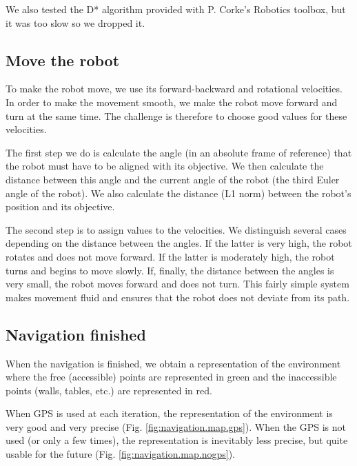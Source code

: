 \documentclass[a4paper, 10pt, conference]{ieeeconf}
\begin{document}
    We also tested the D* algorithm provided with P. Corke's Robotics toolbox, but it was too slow so we dropped it.
    
    \subsection{Move the robot}
    
    To make the robot move, we use its forward-backward and rotational velocities. In order to make the movement smooth, we make the robot move forward and turn at the same time. The challenge is therefore to choose good values for these velocities.
    
    The first step we do is calculate the angle (in an absolute frame of reference) that the robot must have to be aligned with its objective. We then calculate the distance between this angle and the current angle of the robot (the third Euler angle of the robot). We also calculate the distance (L1 norm) between the robot's position and its objective.
    
    The second step is to assign values to the velocities. We distinguish several cases depending on the distance between the angles. If the latter is very high, the robot rotates and does not move forward. If the latter is moderately high, the robot turns and begins to move slowly. If, finally, the distance between the angles is very small, the robot moves forward and does not turn. This fairly simple system makes movement fluid and ensures that the robot does not deviate from its path.
    
    \subsection{Navigation finished}
    
    When the navigation is finished, we obtain a representation of the environment where the free (accessible) points are represented in green and the inaccessible points (walls, tables, etc.) are represented in red.
    
    When GPS is used at each iteration, the representation of the environment is very good and very precise (Fig. \ref{fig:navigation.map.gps}). When the GPS is not used (or only a few times), the representation is inevitably less precise, but quite usable for the future (Fig. \ref{fig:navigation.map.nogps}).
    
\end{document}
